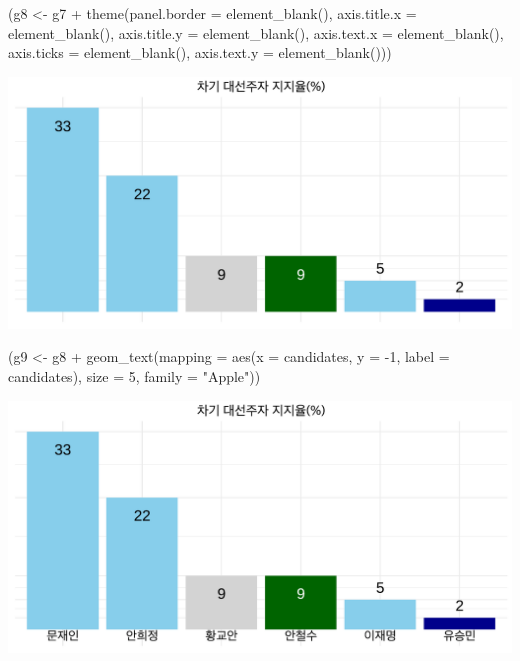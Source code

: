 \documentclass[
]{article}
\newenvironment{Shaded}{}{}
\newcommand{\AttributeTok}[1]{\textcolor[rgb]{0.49,0.56,0.16}{#1}}
\newcommand{\DecValTok}[1]{\textcolor[rgb]{0.25,0.63,0.44}{#1}}
\newcommand{\FunctionTok}[1]{\textcolor[rgb]{0.02,0.16,0.49}{#1}}
\newcommand{\NormalTok}[1]{#1}
\newcommand{\OtherTok}[1]{\textcolor[rgb]{0.00,0.44,0.13}{#1}}
\newcommand{\SpecialCharTok}[1]{\textcolor[rgb]{0.25,0.44,0.63}{#1}}
\newcommand{\StringTok}[1]{\textcolor[rgb]{0.25,0.44,0.63}{#1}}
\begin{document}
\begin{Shaded}
\begin{Highlighting}[]
\NormalTok{(g8 }\OtherTok{\textless{}{-}}\NormalTok{ g7 }\SpecialCharTok{+}
  \FunctionTok{theme}\NormalTok{(}\AttributeTok{panel.border =} \FunctionTok{element\_blank}\NormalTok{(),}
        \AttributeTok{axis.title.x =} \FunctionTok{element\_blank}\NormalTok{(),}
        \AttributeTok{axis.title.y =} \FunctionTok{element\_blank}\NormalTok{(),}
        \AttributeTok{axis.text.x =} \FunctionTok{element\_blank}\NormalTok{(),}
        \AttributeTok{axis.ticks =} \FunctionTok{element\_blank}\NormalTok{(), }
        \AttributeTok{axis.text.y =} \FunctionTok{element\_blank}\NormalTok{()))}
\end{Highlighting}
\end{Shaded}

\includegraphics{poll_JTBC_1702_pdf_files/figure-latex/unnamed-chunk-6-1.pdf}

\begin{Shaded}
\begin{Highlighting}[]
\NormalTok{(g9 }\OtherTok{\textless{}{-}}\NormalTok{ g8 }\SpecialCharTok{+}
    \FunctionTok{geom\_text}\NormalTok{(}\AttributeTok{mapping =} \FunctionTok{aes}\NormalTok{(}\AttributeTok{x =}\NormalTok{ candidates,}
                            \AttributeTok{y =} \SpecialCharTok{{-}}\DecValTok{1}\NormalTok{,}
                            \AttributeTok{label =}\NormalTok{ candidates),}
              \AttributeTok{size =} \DecValTok{5}\NormalTok{,}
              \AttributeTok{family =} \StringTok{"Apple"}\NormalTok{))}
\end{Highlighting}
\end{Shaded}

\includegraphics{poll_JTBC_1702_pdf_files/figure-latex/unnamed-chunk-7-1.pdf}
\end{document}
